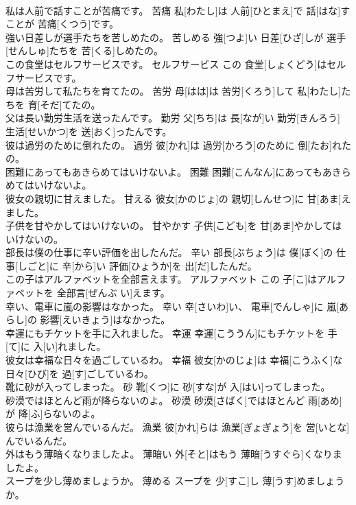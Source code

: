 \documentclass[8pt]{extreport}
\begin{document}
\begin{CJK}{UTF8}{min}
\\	私は人前で話すことが苦痛です。	苦痛	私[わたし]は 人前[ひとまえ]で 話[はな]すことが 苦痛[くつう]です。	
\\	強い日差しが選手たちを苦しめたの。	苦しめる	強[つよ]い 日差[ひざ]しが 選手[せんしゅ]たちを 苦[くる]しめたの。	
\\	この食堂はセルフサービスです。	セルフサービス	この 食堂[しょくどう]はセルフサービスです。	
\\	母は苦労して私たちを育てたの。	苦労	母[はは]は 苦労[くろう]して 私[わたし]たちを 育[そだ]てたの。	
\\	父は長い勤労生活を送ったんです。	勤労	父[ちち]は 長[なが]い 勤労[きんろう] 生活[せいかつ]を 送[おく]ったんです。	
\\	彼は過労のために倒れたの。	過労	彼[かれ]は 過労[かろう]のために 倒[たお]れたの。	
\\	困難にあってもあきらめてはいけないよ。	困難	困難[こんなん]にあってもあきらめてはいけないよ。	
\\	彼女の親切に甘えました。	甘える	彼女[かのじょ]の 親切[しんせつ]に 甘[あま]えました。	
\\	子供を甘やかしてはいけないの。	甘やかす	子供[こども]を 甘[あま]やかしてはいけないの。	
\\	部長は僕の仕事に辛い評価を出したんだ。	辛い	部長[ぶちょう]は 僕[ぼく]の 仕事[しごと]に 辛[から]い 評価[ひょうか]を 出[だ]したんだ。	
\\	この子はアルファベットを全部言えます。	アルファベット	この 子[こ]はアルファベットを 全部言[ぜんぶ い]えます。	
\\	幸い、電車に嵐の影響はなかった。	幸い	幸[さいわ]い、 電車[でんしゃ]に 嵐[あらし]の 影響[えいきょう]はなかった。	
\\	幸運にもチケットを手に入れました。	幸運	幸運[こううん]にもチケットを 手[て]に 入[い]れました。	
\\	彼女は幸福な日々を過ごしているわ。	幸福	彼女[かのじょ]は 幸福[こうふく]な 日々[ひび]を 過[す]ごしているわ。	
\\	靴に砂が入ってしまった。	砂	靴[くつ]に 砂[すな]が 入[はい]ってしまった。	
\\	砂漠ではほとんど雨が降らないのよ。	砂漠	砂漠[さばく]ではほとんど 雨[あめ]が 降[ふ]らないのよ。	
\\	彼らは漁業を営んでいるんだ。	漁業	彼[かれ]らは 漁業[ぎょぎょう]を 営[いとな]んでいるんだ。	
\\	外はもう薄暗くなりましたよ。	薄暗い	外[そと]はもう 薄暗[うすぐら]くなりましたよ。	
\\	スープを少し薄めましょうか。	薄める	スープを 少[すこ]し 薄[うす]めましょうか。	

\end{CJK}
\end{document}
